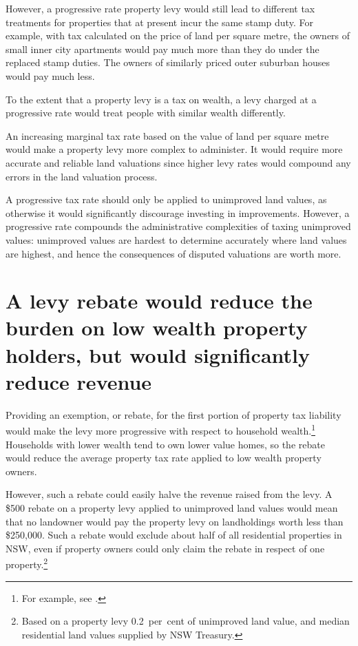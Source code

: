 \documentclass[twoside,english]{Dianab5ona4portrait}
\begin{document}
However, a progressive rate property levy would still lead to different tax treatments for properties that at present incur the same stamp duty. For example, with tax calculated on the price of land per square metre, the owners of small inner city apartments would pay much more than they do under the replaced stamp duties. The owners of similarly priced outer suburban houses would pay much less. 

To the extent that a property levy is a tax on wealth, a levy charged at a progressive rate would treat people with similar wealth differently. 

An increasing marginal tax rate based on the value of land per square metre would make a property levy more complex to administer. It would require more accurate and reliable land valuations since higher levy rates would compound any errors in the land valuation process. 

A progressive tax rate should only be applied to unimproved land values, as otherwise it would significantly discourage investing in improvements. However, a progressive rate compounds the administrative complexities of taxing unimproved values: unimproved values are hardest to determine accurately where land values are highest, and hence the consequences of disputed valuations are worth more.

\section{\label{sec:PROP-6-2}A levy rebate would reduce the burden on low wealth property holders, but would significantly reduce revenue}
Providing an exemption, or rebate, for the first portion of property tax liability would make the levy more progressive with respect to household wealth.\footnote{For example, see \textcite[][8]{SlackBird2014}.}  Households with lower wealth tend to own lower value homes, so the rebate would reduce the average property tax rate applied to low wealth property owners.  

However, such a rebate could easily halve the revenue raised from the levy. A \$500 rebate on a property levy applied to unimproved land values would mean that no landowner would pay the property levy on landholdings worth less than \$250,000. Such a rebate would exclude about half of all residential properties in NSW, even if property owners could only claim the rebate in respect of one property.\footnote{Based on a property levy 0.2~per~cent of unimproved land value, and median residential land values supplied by NSW Treasury.}
\end{document}
